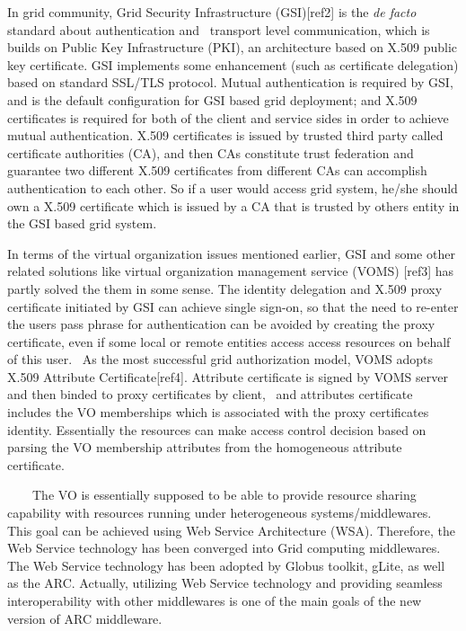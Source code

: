 \documentclass{article}
\begin{document}
In grid community, Grid Security Infrastructure (GSI)[ref2] is the
\textit{de facto} standard about authentication and \ transport level
communication, which is builds on Public Key Infrastructure (PKI), an
architecture based on X.509 public key certificate. GSI implements some
enhancement (such as certificate delegation) based on standard SSL/TLS
protocol. Mutual authentication is required by GSI, and is the default
configuration for GSI based grid deployment; and X.509 certificates is
required for both of the client and service sides in order to achieve
mutual authentication. X.509 certificates is issued by trusted third
party called certificate authorities (CA), and then CAs constitute
trust federation and guarantee two different X.509 certificates from
different CAs can accomplish authentication to each other. So if a user
would access grid system, he/she should own a X.509 certificate which
is issued by a CA that is trusted by other{\textquotesingle}s entity in
the GSI based grid system.

In terms of the virtual organization issues mentioned earlier, GSI and
some other related solutions like virtual organization management
service (VOMS) [ref3] has partly solved the them in some sense. The
identity delegation and X.509 proxy certificate initiated by GSI can
achieve single sign-on, so that the need to re-enter the
user{\textquotesingle}s pass phrase for authentication can be avoided
by creating the proxy certificate, even if some local or remote
entities access access resources on behalf of this user. \ As the most
successful grid authorization model, VOMS adopts X.509 Attribute
Certificate[ref4]. Attribute certificate is signed by VOMS server and
then binded to proxy certificates by client, \ and attributes
certificate includes the VO memberships which is associated with the
proxy certificate{\textquotesingle}s identity. Essentially the
resources can make access control decision based on parsing the VO
membership attributes from the homogeneous attribute certificate. 

\ \ \ \ The VO is essentially supposed to be able to provide resource
sharing capability with resources running under heterogeneous
systems/middlewares. This goal can be achieved using Web Service
Architecture (WSA). Therefore, the Web Service technology has been
converged into Grid computing middlewares. The Web Service technology
has been adopted by Globus toolkit, gLite, as well as the ARC.
Actually, utilizing Web Service technology and providing seamless
interoperability with other middlewares is one of the main goals of the
new version of ARC middleware.
\end{document}
